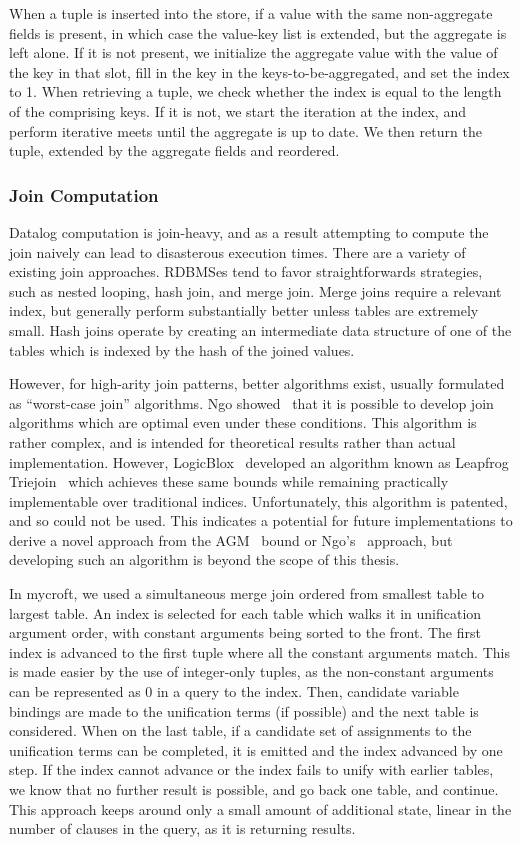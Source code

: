 When a tuple is inserted into the store, if a value with the same non-aggregate fields is present, in which case the value-key list is extended, but the aggregate is left alone.
If it is not present, we initialize the aggregate value with the value of the key in that slot, fill in the key in the keys-to-be-aggregated, and set the index to 1.
When retrieving a tuple, we check whether the index is equal to the length of the comprising keys.
If it is not, we start the iteration at the index, and perform iterative meets until the aggregate is up to date.
We then return the tuple, extended by the aggregate fields and reordered.

\subsubsection{Join Computation}
Datalog computation is join-heavy, and as a result attempting to compute the join naively can lead to disasterous execution times.
There are a variety of existing join approaches.
RDBMSes tend to favor straightforwards strategies, such as nested looping, hash join, and merge join.
Merge joins require a relevant index, but generally perform substantially better unless tables are extremely small.
Hash joins operate by creating an intermediate data structure of one of the tables which is indexed by the hash of the joined values.

However, for high-arity join patterns, better algorithms exist, usually formulated as ``worst-case join'' algorithms.
Ngo showed~\cite{nprr} that it is possible to develop join algorithms which are optimal even under these conditions.
This algorithm is rather complex, and is intended for theoretical results rather than actual implementation.
However, LogicBlox~\cite{logicblox} developed an algorithm known as Leapfrog Triejoin~\cite{lftj} which achieves these same bounds while remaining practically implementable over traditional indices.
Unfortunately, this algorithm is patented, and so could not be used.
This indicates a potential for future implementations to derive a novel approach from the AGM~\cite{agm} bound or Ngo's~\cite{nprr} approach, but developing such an algorithm is beyond the scope of this thesis.

In mycroft, we used a simultaneous merge join ordered from smallest table to largest table.
An index is selected for each table which walks it in unification argument order, with constant arguments being sorted to the front.
The first index is advanced to the first tuple where all the constant arguments match.
This is made easier by the use of integer-only tuples, as the non-constant arguments can be represented as 0 in a query to the index.
Then, candidate variable bindings are made to the unification terms (if possible) and the next table is considered.
When on the last table, if a candidate set of assignments to the unification terms can be completed, it is emitted and the index advanced by one step.
If the index cannot advance or the index fails to unify with earlier tables, we know that no further result is possible, and go back one table, and continue.
This approach keeps around only a small amount of additional state, linear in the number of clauses in the query, as it is returning results.

